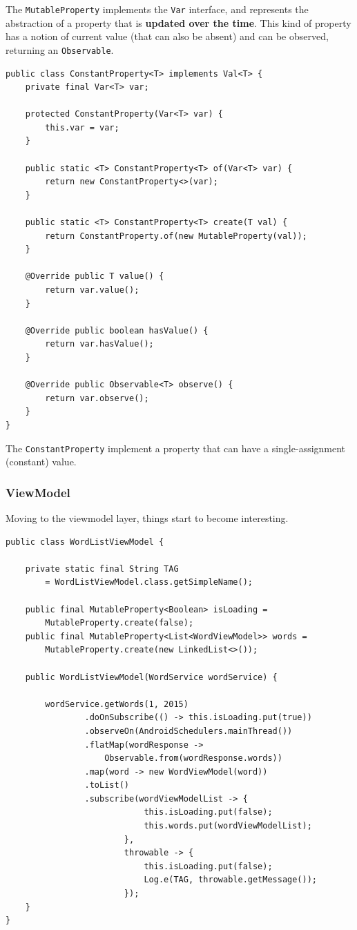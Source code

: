 The \texttt{MutableProperty} implements the \texttt{Var} interface, and
represents the abstraction of a property that is \textbf{updated over
the time}. This kind of property has a notion of current value (that can
also be absent) and can be observed, returning an \texttt{Observable}.

\begin{verbatim}
public class ConstantProperty<T> implements Val<T> {
    private final Var<T> var;

    protected ConstantProperty(Var<T> var) {
        this.var = var;
    }

    public static <T> ConstantProperty<T> of(Var<T> var) {
        return new ConstantProperty<>(var);
    }

    public static <T> ConstantProperty<T> create(T val) {
        return ConstantProperty.of(new MutableProperty(val));
    }

    @Override public T value() {
        return var.value();
    }

    @Override public boolean hasValue() {
        return var.hasValue();
    }

    @Override public Observable<T> observe() {
        return var.observe();
    }
}
\end{verbatim}

The \texttt{ConstantProperty} implement a property that can have a
single-assignment (constant) value.

\subsubsection{ViewModel}\label{viewmodel}

Moving to the viewmodel layer, things start to become interesting.

\begin{verbatim}
public class WordListViewModel {

    private static final String TAG 
    	= WordListViewModel.class.getSimpleName();

    public final MutableProperty<Boolean> isLoading =
        MutableProperty.create(false);
    public final MutableProperty<List<WordViewModel>> words =
        MutableProperty.create(new LinkedList<>());

    public WordListViewModel(WordService wordService) {

        wordService.getWords(1, 2015)
                .doOnSubscribe(() -> this.isLoading.put(true))
                .observeOn(AndroidSchedulers.mainThread())
                .flatMap(wordResponse ->
                    Observable.from(wordResponse.words))
                .map(word -> new WordViewModel(word))
                .toList()
                .subscribe(wordViewModelList -> {
                            this.isLoading.put(false);
                            this.words.put(wordViewModelList);
                        },
                        throwable -> {
                            this.isLoading.put(false);
                            Log.e(TAG, throwable.getMessage());
                        });
    }
}
\end{verbatim}

